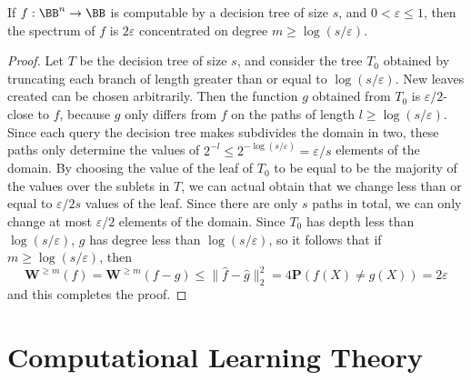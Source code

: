 \begin{theorem}
    If $f: \BB^n \to \BB$ is computable by a decision tree of size $s$, and $0 < \varepsilon \leq 1$, then the spectrum of $f$ is $2\varepsilon$ concentrated on degree $m \geq \log(s/\varepsilon)$.
\end{theorem}
\begin{proof}
    Let $T$ be the decision tree of size $s$, and consider the tree $T_0$ obtained by truncating each branch of length greater than or equal to $\log(s/\varepsilon)$. New leaves created can be chosen arbitrarily. Then the function $g$ obtained from $T_0$ is $\varepsilon/2$-close to $f$, because $g$ only differs from $f$ on the paths of length $l \geq \log(s/\varepsilon)$. Since each query the decision tree makes subdivides the domain in two, these paths only determine the values of $2^{-l} \leq 2^{-\log(s/\varepsilon)} = \varepsilon/s$ elements of the domain. By choosing the value of the leaf of $T_0$ to be equal to be the majority of the values over the sublets in $T$, we can actual obtain that we change less than or equal to $\varepsilon/2s$ values of the leaf. Since there are only $s$ paths in total, we can only change at most $\varepsilon/2$ elements of the domain. Since $T_0$ has depth less than $\log(s/\varepsilon)$, $g$ has degree less than $\log(s/\varepsilon)$, so it follows that if $m \geq \log(s/\varepsilon)$, then
    \[ \mathbf{W}^{\geq m}(f) = \mathbf{W}^{\geq m}(f - g) \leq \| \widehat{f} - \widehat{g} \|_2^2 = 4 \mathbf{P}(f(X) \neq g(X)) = 2\varepsilon \]
    and this completes the proof.
\end{proof}




\section{Computational Learning Theory}

